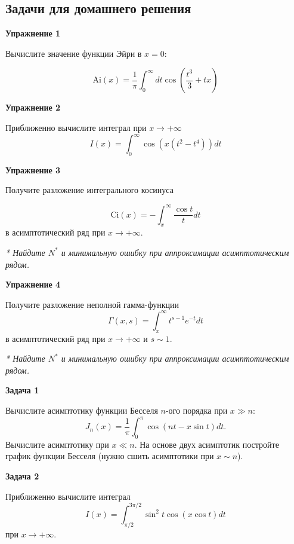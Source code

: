 \documentclass[a4paper,12pt]{article}
\begin{document}
\newpage
\subsection*{Задачи для домашнего решения}

\noindent \textbf{Упражнение 1}

\noindent Вычислите значение функции Эйри в $x=0$:

$$
\mathrm{Ai}(x)	=\frac{1}{\pi}\int_{0}^{\infty}dt\cos(\frac{t^{3}}{3}+tx)
$$

\vspace{15pt}
\noindent \textbf{Упражнение 2}

\noindent Приближенно вычислите интеграл при $x\rightarrow+\infty$
$$
I(x)	=\int_{0}^{\infty}\cos(x(t^{2}-t^{4}))dt
$$

\vspace{15pt}
\noindent \textbf{Упражнение 3}

\noindent Получите разложение интегрального косинуса

$$
\mathrm{Ci}(x)	=-\int_{x}^{\infty}\frac{\cos t}{t}dt
$$
\noindent в асимптотический ряд при $x\rightarrow+\infty$.

\noindent \textit{* Найдите $N^{*}$ и минимальную ошибку при аппроксимации асимптотическим рядом.}

\vspace{15pt}
\noindent \textbf{Упражнение 4}

\noindent Получите разложение неполной гамма-функции
$$
\Gamma(x,s)	=\int_{x}^{\infty}t^{s-1}e^{-t}dt
$$
\noindent в асимптотический ряд при $x\rightarrow+\infty$ и $s\sim 1$.

\noindent \textit{* Найдите $N^{*}$ и минимальную ошибку при аппроксимации асимптотическим рядом.}

\vspace{15pt}
\noindent \textbf{Задача 1}

\noindent Вычислите асимптотику функции Бесселя $n$-ого порядка при $x\gg n$:
$$
J_{n}(x)	=\frac{1}{\pi}\int_{0}^{\pi}\cos(nt-x\sin t)dt.
$$
\noindent Вычислите асимптотику при $x\ll n$. На основе двух асимптотик постройте график функции Бесселя (нужно сшить асимптотики при $x\sim n$).

\vspace{15pt}
\noindent \textbf{Задача 2}

\noindent Приближенно вычислите интеграл
$$
I(x)	=\int_{\pi/2}^{3\pi/2}\sin^{2}t\cos(x\cos t)dt
$$
\noindent при $x\rightarrow+\infty$.
\end{document}
